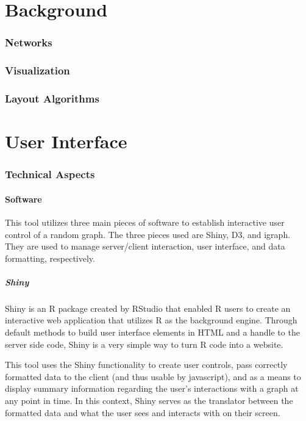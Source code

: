 \documentclass{article}\usepackage{graphicx, color}
\begin{document}
\part{Background}
\section{Networks}
\section{Visualization}
\section{Layout Algorithms}

\part{User Interface}
\section{Technical Aspects}
\subsection{Software}
This tool utilizes three main pieces of software to establish interactive user control of a random graph. The three pieces used are Shiny, D3, and igraph. They are used to manage server/client interaction, user interface, and data formatting, respectively.


\subsubsection{Shiny}
Shiny is an R package created by RStudio that enabled R users to create an interactive web application that utilizes R as the background engine. Through default methods to build user interface elements in HTML and a handle to the server side code, Shiny is a very simple way to turn R code into a website. 

This tool uses the Shiny functionality to create user controls, pass correctly formatted data to the client (and thus usable by javascript), and as a means to display summary information regarding the user's interactions with a graph at any point in time. In this context, Shiny serves as the translator between the formatted data and what the user sees and interacts with on their screen.
\end{document}

